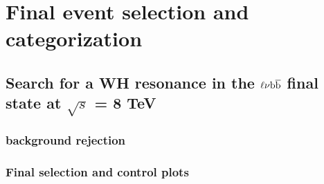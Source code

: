 \chapter{Final event selection and categorization}\label{ch:finalselection}

\section{Search for a WH resonance in the $\ell\nu{\mathrm{b}\overline{\mathrm{b}}}$ final state at $\sqrt{s}$ = 8 TeV}

\subsection{\ttbar background rejection}

\subsection{Final selection and control plots}

